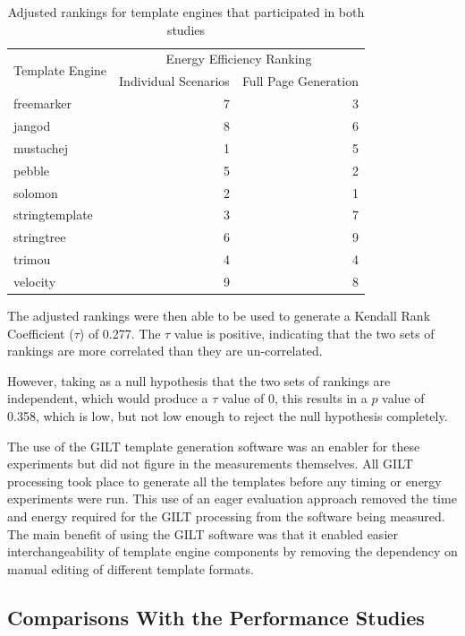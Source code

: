 \begin{table}[ht]
\centering
\begin{tabular}{lrr}
\multirow{2}{*}{Template Engine} 
      & \multicolumn{2}{c}{Energy Efficiency Ranking} \\
& Individual Scenarios & Full Page Generation \\
\hline
freemarker & 7 & 3 \\
jangod & 8 & 6 \\
mustachej & 1 & 5 \\
pebble & 5 & 2 \\
solomon & 2 & 1 \\
stringtemplate & 3 & 7 \\
stringtree & 6 & 9 \\
trimou & 4 & 4 \\
velocity & 9 & 8 \\
\end{tabular}
\caption{Adjusted rankings for template engines that participated in both studies\label{ce rankings exc}}
\end{table}

The adjusted rankings were then able to be used to generate a Kendall Rank Coefficient ($\tau$) of 0.277.
The $\tau$ value is positive, indicating that the two sets of rankings are more correlated than they are un-correlated.

However, taking as a null hypothesis that the two sets of rankings are independent, which would produce a $\tau$ value of 0, this results in a $p$ value of 0.358, which is low, but not low enough to reject the null hypothesis completely.

\label{A212}
The use of the GILT template generation software was an enabler for these experiments but did not figure in the measurements themselves. All GILT processing took place to generate all the templates before any timing or energy experiments were run. This use of an \gls{eager evaluation} approach removed the time and energy required for the GILT processing from the software being measured. The main benefit of using the GILT software was that it enabled easier interchangeability of template engine components by removing the dependency on manual editing of different template formats.

\subsection{Comparisons With the Performance Studies}
\label{ce performance}

